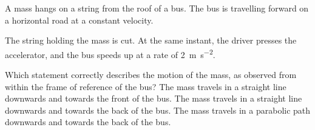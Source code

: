 \begin{quizq}{}
A mass hangs on a string from the roof of a bus. The bus is travelling forward on a horizontal road
at a constant velocity.
\begin{center}
\end{center}
The string holding the mass is cut. At the same instant, the driver presses the accelerator, and
the bus speeds up at a rate of \qty{2}{m.s^{-2}}.

Which statement correctly describes the motion of the mass, as observed from within the frame of
reference of the bus?
  {The mass travels in a straight line downwards and towards the front of the bus.}
  {The mass travels in a straight line downwards and towards the back of the bus.}
  {The mass travels in a parabolic path downwards and towards the back of the bus.}
\end{quizq}


